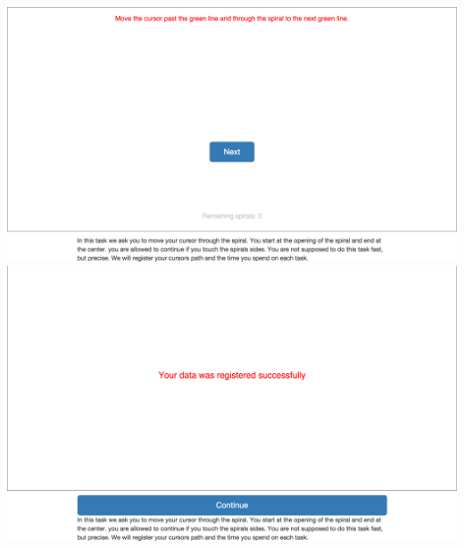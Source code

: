\begin{appendices}
\begin{minipage}{\textwidth}
\centering
\includegraphics[width=\textwidth]{images/screenshots/ex_step_5_spiral_next}
\label{fig:ex_step_5_spiral_next}
\includegraphics[width=\textwidth]{images/screenshots/ex_step_5_spiral_done}
\label{fig:ex_step_5_spiral_done}
\end{minipage}


\end{appendices}
